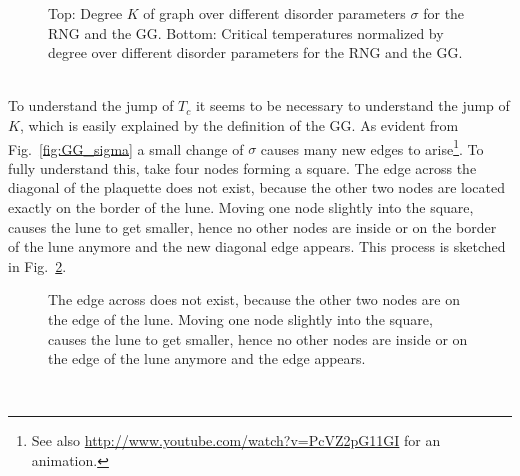         \begin{figure}[htb]
            \centering


            \caption[Critical Temperature Normalized by Degree of the Graph]
            {
                Top: Degree \(K\) of graph over different
                disorder parameters \(\sigma\) for
                 the RNG and
                 the GG.
                Bottom: Critical temperatures normalized by degree over different
                disorder parameters for
                 the RNG and
                 the GG.
            }
            \label{fig:Tc_deg}
        \end{figure}\\
        To understand the jump of \(T_c\) it seems to be necessary to
        understand the jump of \(K\), which is easily explained
        by the definition of the GG. As evident from Fig.\ \ref{fig:GG_sigma}
        a small change of \(\sigma\) causes many new edges to arise\footnote{See also \url{http://www.youtube.com/watch?v=PcVZ2pG11GI} for an animation.}.
        To fully understand this, take four nodes forming a square. The edge
        across the diagonal of the plaquette does not exist, because the
        other two nodes are located exactly on the border
        of the lune. Moving one node slightly into the square, causes the lune
        to get smaller, hence no other nodes are inside or on the border of
        the lune anymore and the new diagonal edge appears. This process is sketched in
        Fig.\ \ref{fig:GGEdge}.
        \begin{figure}[htb]
            \centering
            \subfigure[][]{
                \label{sfig:GGEdge:before}
                
            }
            \subfigure[][]{
                \label{sfig:GGEdge:after}
                
            }
            \caption[Sketch why Many New Edges Arise at the Transition from $\sigma = 0$ to $\sigma > 0$]
            {
                 The edge across does not exist,
                because the other two nodes are on the edge of the lune.
                 Moving one node slightly into the
                square, causes the lune to get smaller, hence no other nodes
                are inside or on the edge of the lune anymore and the edge
                appears.
            }
            \label{fig:GGEdge}
        \end{figure}\\
